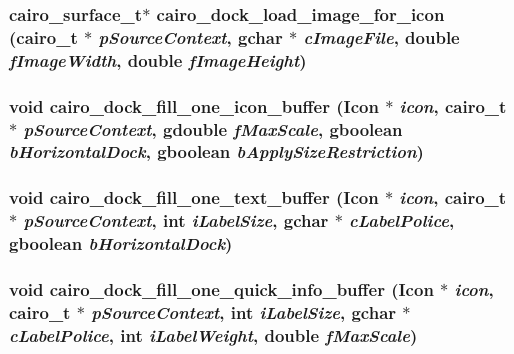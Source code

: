 \subsubsection{\setlength{\rightskip}{0pt plus 5cm}cairo\_\-surface\_\-t$\ast$ cairo\_\-dock\_\-load\_\-image\_\-for\_\-icon (cairo\_\-t $\ast$ {\em pSourceContext}, gchar $\ast$ {\em cImageFile}, double {\em fImageWidth}, double {\em fImageHeight})}\label{cairo-dock-load_8h_2773d15f186da24a5ce837a12f9c9339}


\subsubsection{\setlength{\rightskip}{0pt plus 5cm}void cairo\_\-dock\_\-fill\_\-one\_\-icon\_\-buffer ({\bf Icon} $\ast$ {\em icon}, cairo\_\-t $\ast$ {\em pSourceContext}, gdouble {\em fMaxScale}, gboolean {\em bHorizontalDock}, gboolean {\em bApplySizeRestriction})}\label{cairo-dock-load_8h_bc6ef046a83f95e29d3e50112ad1a06e}


\subsubsection{\setlength{\rightskip}{0pt plus 5cm}void cairo\_\-dock\_\-fill\_\-one\_\-text\_\-buffer ({\bf Icon} $\ast$ {\em icon}, cairo\_\-t $\ast$ {\em pSourceContext}, int {\em iLabelSize}, gchar $\ast$ {\em cLabelPolice}, gboolean {\em bHorizontalDock})}\label{cairo-dock-load_8h_c1c4f6235fed0fe3c1e929d9e3b28a1d}


\subsubsection{\setlength{\rightskip}{0pt plus 5cm}void cairo\_\-dock\_\-fill\_\-one\_\-quick\_\-info\_\-buffer ({\bf Icon} $\ast$ {\em icon}, cairo\_\-t $\ast$ {\em pSourceContext}, int {\em iLabelSize}, gchar $\ast$ {\em cLabelPolice}, int {\em iLabelWeight}, double {\em fMaxScale})}\label{cairo-dock-load_8h_db3794cb1c5c277ebbfabbf7f9cf0353}


